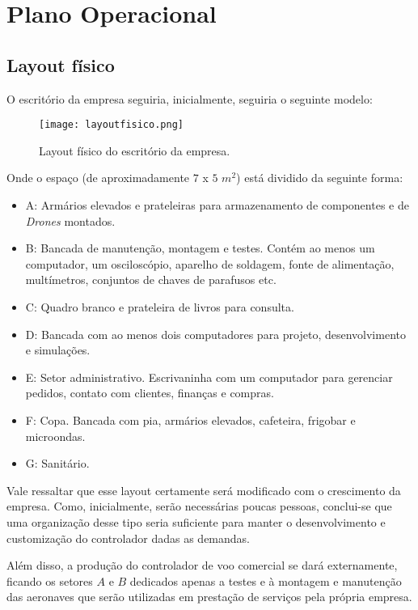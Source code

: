 \section{Plano Operacional}

\subsection{Layout físico}

O escritório da empresa seguiria, inicialmente, seguiria o seguinte
modelo:

\begin{figure}[H]
\centering
\texttt{[image: layoutfisico.png]}
\caption{Layout físico do escritório da empresa.}
\label{fig:layoutfisico}
\end{figure}

Onde o espaço (de aproximadamente $7$ x $5$ $m^2$) está dividido
da seguinte forma:

\begin{itemize}
	\item A: Armários elevados e prateleiras para armazenamento de 
	componentes e de \emph{Drones} montados.
	\item B: Bancada de manutenção, montagem e testes. Contém ao 
	menos um computador, um osciloscópio, aparelho de soldagem, 
	fonte de alimentação, multímetros, conjuntos de chaves de 
	parafusos etc.
	\item C: Quadro branco e prateleira de livros para consulta.
	\item D: Bancada com ao menos dois computadores para projeto,
	desenvolvimento e simulações.
	\item E: Setor administrativo. Escrivaninha com um computador
	para gerenciar pedidos, contato com clientes, finanças e 
	compras.
	\item F: Copa. Bancada com pia, armários elevados, cafeteira,
	frigobar e microondas.
	\item G: Sanitário.
\end{itemize}

Vale ressaltar que esse layout certamente será modificado com 
o crescimento da empresa. Como, inicialmente, serão necessárias
poucas pessoas, conclui-se que uma organização desse tipo seria
suficiente para manter o desenvolvimento e customização do 
controlador dadas as demandas.

Além disso, a produção do controlador de voo comercial se dará 
externamente, ficando os setores $A$ e $B$ dedicados apenas a 
testes e à montagem e manutenção das aeronaves que serão utilizadas 
em prestação de serviços pela própria empresa.

